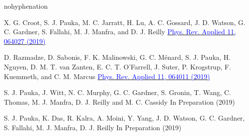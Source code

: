 \begin{hyphenrules}{nohyphenation}
\begin{sloppypar}
      {X. G. Croot, S. J. Pauka, M. C. Jarratt, H. Lu, A. C. Gossard, J. D. Watson, G. C. Gardner, S. Fallahi, M. J. Manfra, and D. J. Reilly}
      {\href{https://doi.org/\detokenize{10.1103/PhysRevApplied.11.064027}}{\textcolor{blue}{Phys. Rev. Applied 11, 064027 (2019)}}}

      {D. Razmadze, D. Sabonis, F. K. Malinowski, G. C. Ménard, S. J. Pauka, H. Nguyen, D. M. T. van Zanten, E. C. T. O'Farrell, J. Suter, P. Krogstrup, F. Kuemmeth, and C. M. Marcus}
      {\href{https://doi.org/\detokenize{10.1103/PhysRevApplied.11.064011}}{\textcolor{blue}{Phys. Rev. Applied 11, 064011 (2019)}}}

      {S. J. Pauka, J. Witt, N. C. Murphy, G. C. Gardner, S. Gronin, T. Wang, C. Thomas, M. J. Manfra, D. J. Reilly and M. C. Cassidy}
      {In Preparation (2019)}

      {S. J. Pauka, K. Das, R. Kalra, A. Moini, Y. Yang, J. D. Watson, G. C. Gardner, S. Fallahi, M. J. Manfra, D. J. Reilly}
      {In Preparation (2019)}

      \makeatletter
      \let\parskip=\old@parskip
      \makeatother
  \end{sloppypar}
\end{hyphenrules}
\newpage\null\newpage

\makeatletter
\let\chapter\old@chapter
\let\@makeschapterhead\old@makeschapterhead
\makeatother